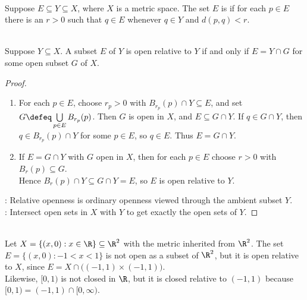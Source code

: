 \begin{definition} \label{def:relative-open-subset} \\
Suppose $E\subseteq Y\subseteq X$, where $X$ is a metric space. The set $E$ is  if for each $p\in E$ there is an $r>0$ such that $q\in E$ whenever $q\in Y$ and $d(p,q)<r$.
\end{definition}

\begin{theorem} \label{thm:relative-open-intersection-with-open-set} \\
Suppose $Y\subseteq X$. A subset $E$ of $Y$ is open relative to $Y$ if and only if $E=Y\cap G$ for some open subset $G$ of $X$.
\begin{proof}
\begin{enumerate}[label=\roman*.]
\setlength{\itemsep}{0pt}
\item[$(\Rightarrow)$] For each $p\in E$, choose $r_p>0$ with $B_{r_p}(p)\cap Y\subseteq E$, and set $G\defeq\bigcup\limits_{p\in E}B_{r_p}(p)$. Then $G$ is open in $X$, and $E\subseteq G\cap Y$. If $q\in G\cap Y$, then $q\in B_{r_p}(p)\cap Y$ for some $p\in E$, so $q\in E$. Thus $E=G\cap Y$.
\item[$(\Leftarrow)$] If $E=G\cap Y$ with $G$ open in $X$, then for each $p\in E$ choose $r>0$ with $B_r(p)\subseteq G$.\\
Hence $B_r(p)\cap Y\subseteq G\cap Y=E$, so $E$ is open relative to $Y$.
\end{enumerate}
: Relative openness is ordinary openness viewed through the ambient subset $Y$.\\
: Intersect open sets in $X$ with $Y$ to get exactly the open sets of $Y$.
\end{proof}
\end{theorem}

\begin{example} \label{ex:relative-topology-ambient-examples} \\
Let $X=\{(x,0):x\in\R\}\subseteq\R^2$ with the metric inherited from $\R^2$. The set $E=\{(x,0):-1<x<1\}$ is not open as a subset of $\R^2$, but it is open relative to $X$, since $E=X\cap\bigl((-1,1)\times(-1,1)\bigr)$.\\
Likewise, $[0,1)$ is not closed in $\R$, but it is closed relative to $(-1,1)$ because $[0,1)=(-1,1)\cap[0,\infty)$.
\end{example}

